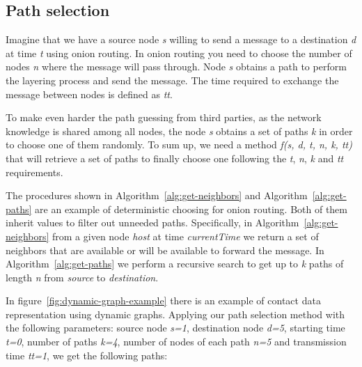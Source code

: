 \subsection{Path selection}


Imagine that we have a source node \textit{s} willing to send a message to a destination \textit{d} at time \textit{t} using onion routing. In onion routing you need to choose the number of nodes  \textit{n} where the message will pass through. Node \textit{s} obtains a path to perform the layering process and send the message. The time required to exchange the message between nodes is defined as \textit{tt}. 

To make even harder the path guessing from third parties, as the network knowledge is shared among all nodes, the node \textit{s} obtains a set of paths \textit{k} in order to choose one of them randomly. To sum up, we need a method \textit{f(s, d, t, n, k, tt)} that will retrieve a set of paths to finally choose one following the \textit{t}, \textit{n}, \textit{k} and \textit{tt} requirements. 

The procedures shown in Algorithm~\ref{alg:get-neighbors} and Algorithm~\ref{alg:get-paths} are an example of deterministic choosing for onion routing. Both of them inherit values to filter out unneeded paths. Specifically, in Algorithm~\ref{alg:get-neighbors} from a given node \textit{host} at time \textit{currentTime} we return a set of neighbors  that are available or will be available to forward the message. In Algorithm~\ref{alg:get-paths} we perform a recursive search to get up to \textit{k} paths of length \textit{n} from \textit{source} to \textit{destination}.

In figure~\ref{fig:dynamic-graph-example} there is an example of contact data representation using dynamic graphs. Applying our path selection method with the following parameters: source node \textit{s=1}, destination node \textit{d=5}, starting time \textit{t=0}, number of paths \textit{k=4}, number of nodes of each path \textit{n=5} and transmission time \textit{tt=1}, we get the following paths: \\

